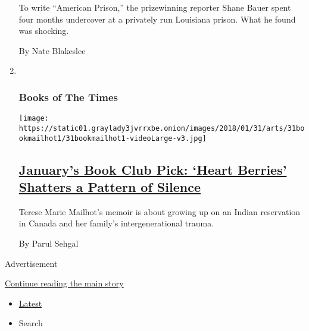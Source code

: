 \begin{enumerate}
  To write ``American Prison,'' the prizewinning reporter Shane Bauer
  spent four months undercover at a privately run Louisiana prison. What
  he found was shocking.

  By Nate Blakeslee
\item ~
  \hypertarget{books-of-the-times-1}{%
  \subsubsection{Books of The Times}\label{books-of-the-times-1}}

  \texttt{[image: https://static01.graylady3jvrrxbe.onion/images/2018/01/31/arts/31bookmailhot1/31bookmailhot1-videoLarge-v3.jpg]}

  \hypertarget{januarys-book-club-pick-heart-berries-shatters-a-pattern-of-silence}{%
  \subsection{\texorpdfstring{\href{/2018/01/30/books/review-heart-berries-terese-marie-mailhot.html}{January's
  Book Club Pick: `Heart Berries' Shatters a Pattern of
  Silence}}{January's Book Club Pick: `Heart Berries' Shatters a Pattern of Silence}}\label{januarys-book-club-pick-heart-berries-shatters-a-pattern-of-silence}}

  Terese Marie Mailhot's memoir is about growing up on an Indian
  reservation in Canada and her family's intergenerational trauma.

  By Parul Sehgal
\end{enumerate}

Advertisement

\protect\hyperlink{after-mid1}{Continue reading the main story}

\begin{itemize}
\tightlist
\item
  \protect\hyperlink{stream-panel}{Latest}
\item
  Search
\end{itemize}

